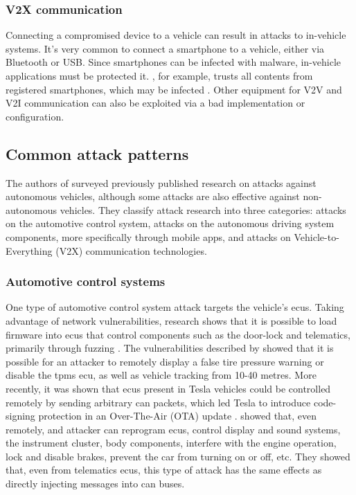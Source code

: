\subsubsection{V2X communication}

Connecting a compromised device to a vehicle can result in attacks to in-vehicle systems. It's very common to connect a smartphone to a vehicle, either via Bluetooth or USB. Since smartphones can be infected with malware, in-vehicle applications must be protected it. \cite{mirrorlink}, for example, trusts all contents from registered smartphones, which may be infected \citep{mazloom2016security}. Other equipment for V2V and V2I communication can also be exploited via a bad implementation or configuration.

\subsection{Common attack patterns}

The authors of \cite{Kim2021} surveyed previously published research on attacks against autonomous vehicles, although some attacks are also effective against non-autonomous vehicles. They classify attack research into three categories: attacks on the automotive control system, attacks on the autonomous driving system components, more specifically through mobile apps, and attacks on Vehicle-to-Everything (V2X) communication technologies.

\subsubsection{Automotive control systems}

One type of automotive control system attack targets the vehicle’s \glspl{ecu}. Taking advantage of network vulnerabilities, research shows that it is possible to load firmware into \glspl{ecu} that control components such as the door-lock and telematics, primarily through fuzzing \citep{Koscher2010}. The vulnerabilities described by \cite{rouf2010security} showed that it is possible for an attacker to remotely display a false tire pressure warning or disable the \gls{tpms} \gls{ecu}, as well as vehicle tracking from 10-40 metres. More recently, it was shown that \glspl{ecu} present in Tesla vehicles could be controlled remotely by sending arbitrary \gls{can} packets, which led Tesla to introduce code-signing protection in an Over-The-Air (OTA) update \citep{Nie2017}. \cite{miller2015remote} showed that, even remotely, and attacker can reprogram \glspl{ecu}, control display and sound systems, the instrument cluster, body components, interfere with the engine operation, lock and disable brakes, prevent the car from turning on or off, etc. They showed that, even from telematics \glspl{ecu}, this type of attack has the same effects as directly injecting messages into \gls{can} buses.\par


